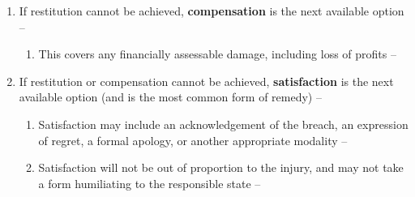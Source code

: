 \begin{enumerate}
\begin{enumerate}
\begin{enumerate}
\begin{enumerate}
            \end{enumerate}
        \end{enumerate}
        \item If restitution cannot be achieved, \textbf{compensation} is the next available option -- 
        \begin{enumerate}
            \item This covers any financially assessable damage, including loss of profits -- 
        \end{enumerate}
        \item If restitution or compensation cannot be achieved, \textbf{satisfaction} is the next available option (and is the most common form of remedy) -- 
        \begin{enumerate}
            \item Satisfaction may include an acknowledgement of the breach, an expression of regret, a formal apology, or another appropriate modality -- 
            \item Satisfaction will not be out of proportion to the injury, and may not take a form humiliating to the responsible state -- 
        \end{enumerate}
    \end{enumerate}
\end{enumerate}

